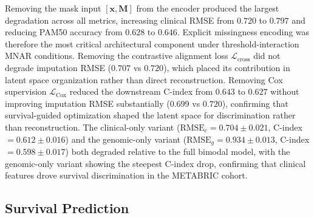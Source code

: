 \documentclass[final,3p,times,authoryear]{elsarticle}
\begin{document}
Removing the mask input $[\mathbf{x}, \mathbf{M}]$ from the encoder produced the largest degradation across all metrics, increasing clinical RMSE from $0.720$ to $0.797$ and reducing PAM50 accuracy from $0.628$ to $0.646$. Explicit missingness encoding was therefore the most critical architectural component under threshold-interaction MNAR conditions. Removing the contrastive alignment loss $\mathcal{L}_{\text{cross}}$ did not degrade imputation RMSE ($0.707$ vs $0.720$), which placed its contribution in latent space organization rather than direct reconstruction. Removing Cox supervision $\mathcal{L}_{\text{Cox}}$ reduced the downstream C-index from $0.643$ to $0.627$ without improving imputation RMSE substantially ($0.699$ vs $0.720$), confirming that survival-guided optimization shaped the latent space for discrimination rather than reconstruction. The clinical-only variant ($\text{RMSE}_c = 0.704 \pm 0.021$, C-index $= 0.612 \pm 0.016$) and the genomic-only variant ($\text{RMSE}_g = 0.934 \pm 0.013$, C-index $= 0.598 \pm 0.017$) both degraded relative to the full bimodal model, with the genomic-only variant showing the steepest C-index drop, confirming that clinical features drove survival discrimination in the METABRIC cohort.



\subsection{Survival Prediction}
\end{document}
